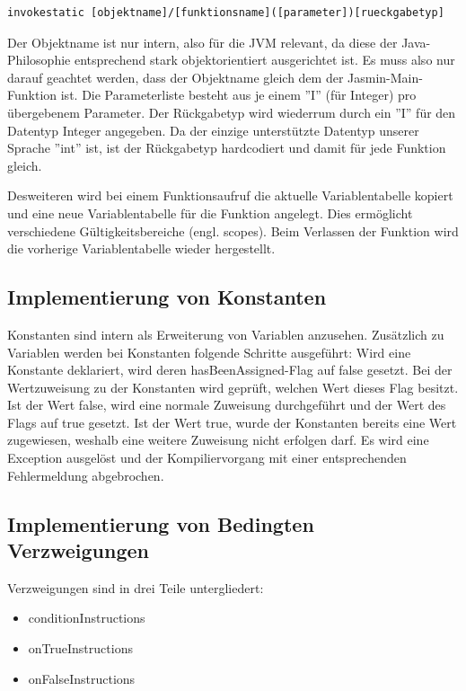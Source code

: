 \begin{lstlisting}[frame=single]
invokestatic [objektname]/[funktionsname]([parameter])[rueckgabetyp]
\end{lstlisting}

Der Objektname ist nur intern, also für die JVM relevant, da diese der Java-Philosophie entsprechend stark objektorientiert ausgerichtet ist. Es muss also nur darauf geachtet werden, dass der Objektname gleich dem der Jasmin-Main-Funktion ist.
Die Parameterliste besteht aus je einem ''I'' (für Integer) pro übergebenem Parameter.
Der Rückgabetyp wird wiederrum durch ein ''I'' für den Datentyp Integer angegeben. Da der einzige unterstützte Datentyp unserer Sprache ''int'' ist, ist der Rückgabetyp hardcodiert und damit für jede Funktion gleich.

Desweiteren wird bei einem Funktionsaufruf die aktuelle Variablentabelle kopiert und eine neue Variablentabelle für die Funktion angelegt. Dies ermöglicht verschiedene Gültigkeitsbereiche (engl. scopes). 
Beim Verlassen der Funktion wird die vorherige Variablentabelle wieder hergestellt.

\subsection{Implementierung von Konstanten}
Konstanten sind intern als Erweiterung von Variablen anzusehen. 
Zusätzlich zu Variablen werden bei Konstanten folgende Schritte ausgeführt:
Wird eine Konstante deklariert, wird deren hasBeenAssigned-Flag auf false gesetzt.
Bei der Wertzuweisung zu der Konstanten wird geprüft, welchen Wert dieses Flag besitzt. Ist der Wert false, wird eine normale Zuweisung durchgeführt und der Wert des Flags auf true gesetzt. Ist der Wert true, wurde der Konstanten bereits eine Wert zugewiesen, weshalb eine weitere Zuweisung nicht erfolgen darf. Es wird eine Exception ausgelöst und der Kompiliervorgang mit einer entsprechenden Fehlermeldung abgebrochen.

\subsection{Implementierung von Bedingten Verzweigungen}
Verzweigungen sind in drei Teile untergliedert:
\begin{itemize}
	\item conditionInstructions
	\item onTrueInstructions
	\item onFalseInstructions	
\end{itemize}


